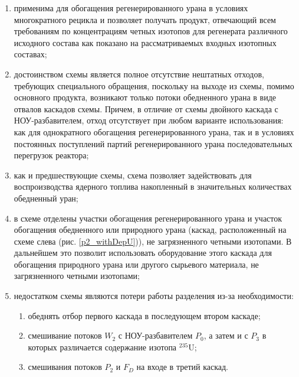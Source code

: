 {\begin{enumerate}
    \item применима для обогащения регенерированного урана в условиях многократного рецикла и позволяет получать продукт, отвечающий всем требованиям по концентрациям четных изотопов для регенерата различного исходного состава как показано на рассматриваемых входных изотопных составах;
    \item достоинством схемы является полное отсутствие нештатных отходов, требующих специального обращения, поскольку на выходе из схемы, помимо основного продукта, возникают только потоки обедненного урана в виде отвалов каскадов схемы. Причем, в отличие от схемы двойного каскада с НОУ-разбавителем, отход отсутствует при любом варианте использования: как для однократного обогащения регенерированного урана, так и в условиях постоянных поступлений партий регенерированного урана последовательных перегрузок реактора;
    \item как и предшествующие схемы, схема позволяет задействовать для воспроизводства ядерного топлива накопленный в значительных количествах обедненный уран;
    \item в схеме отделены участки обогащения регенерированного урана и участок обогащения обедненного или природного урана (каскад, расположенный на схеме слева (рис. 
    \ref{p2_withDepU})), не загрязненного четными изотопами. В дальнейшем это позволит использовать оборудование этого каскада для обогащения природного урана или другого сырьевого материала, не загрязненного четными изотопами;
    \item недостатком схемы являются потери работы разделения из-за необходимости:
    \begin{enumerate}
        \item обеднять отбор первого каскада в последующем втором каскаде;
        \item смешивание потоков $W_2$ с НОУ-разбавителем $P_0$, а затем и с $P_3$ в которых различается содержание изотопа $^{235}$U;
        \item смешивания потоков $P_2$ и $F_D$ на входе в третий каскад.
    \end{enumerate}
\end{enumerate}


}
